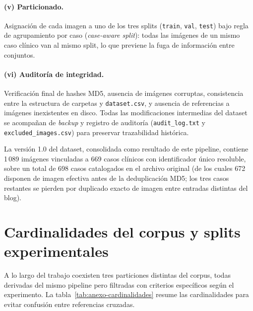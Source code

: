 \paragraph{(v) Particionado.} Asignación de cada imagen a uno de los
tres splits (\texttt{train}, \texttt{val}, \texttt{test}) bajo regla
de agrupamiento por caso (\emph{case-aware split}): todas las
imágenes de un mismo caso clínico van al mismo split, lo que previene
la fuga de información entre conjuntos.

\paragraph{(vi) Auditoría de integridad.} Verificación final de
hashes MD5, ausencia de imágenes corruptas, consistencia entre la
estructura de carpetas y \texttt{dataset.csv}, y ausencia de
referencias a imágenes inexistentes en disco. Todas las
modificaciones intermedias del dataset se acompañan de \emph{backup} y
registro de auditoría (\texttt{audit\_log.txt} y
\texttt{excluded\_images.csv}) para preservar trazabilidad histórica.

La versión 1.0 del dataset, consolidada como resultado de este
pipeline, contiene 1\,089 imágenes vinculadas a 669 casos
clínicos con identificador único resoluble, sobre un total de
698 casos catalogados en el archivo original (de los cuales 672
disponen de imagen efectiva antes de la deduplicación MD5; los
tres casos restantes se pierden por duplicado exacto de imagen
entre entradas distintas del blog).

\section{Cardinalidades del corpus y splits experimentales}
\label{sec:anexo-cardinalidades}

A lo largo del trabajo coexisten tres particiones distintas del
corpus, todas derivadas del mismo pipeline pero filtradas con
criterios específicos según el experimento. La
tabla~\ref{tab:anexo-cardinalidades} resume las cardinalidades para
evitar confusión entre referencias cruzadas.

